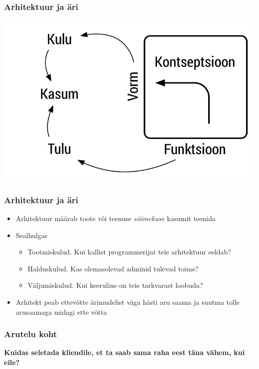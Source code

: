 \begin{frame}[fragile]
  \frametitle{Arhitektuur ja äri}
  	\begin{center}
			\includegraphics[width=.7\textwidth]{ffc_profit.pdf}
	\end{center}
\end{frame}

\begin{frame}[fragile]
	\frametitle{Arhitektuur ja äri}
			\begin{itemize}
				\item Arhitektuur määrab toote või teenuse \emph{võimekuse} kasumit teenida
				\item Sealhulgas
				\begin{itemize}
					\item Tootmiskulud. Kui kallist programmerijat teie arhitektuur eeldab?
					\item Halduskulud. Kas olemasolevad adminid tulevad toime?
					\item Väljumiskulud. Kui keeruline on teie tarkvarast loobuda?
				\end{itemize}
				\item Arhitekt peab ettevõtte ärimudelist väga hästi aru saama ja suutma tolle arusaamaga midagi ette võtta
			\end{itemize}
\end{frame}

\begin{frame}[fragile]
  \frametitle{Arutelu koht}
		\begin{center}
			\textbf{Kuidas seletada kliendile, et ta saab sama raha eest täna vähem, kui eile?}
		\end{center}
\end{frame}

